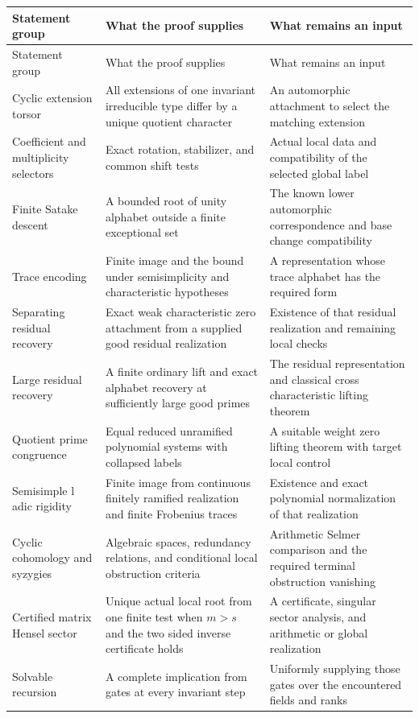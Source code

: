 \begin{longtable}{>{\raggedright\arraybackslash}p{.24\linewidth}>{\raggedright\arraybackslash}p{.33\linewidth}>{\raggedright\arraybackslash}p{.34\linewidth}}
\toprule
Statement group & What the proof supplies & What remains an input\\
\midrule
\endfirsthead
\toprule
Statement group & What the proof supplies & What remains an input\\
\midrule
\endhead
Cyclic extension torsor & All extensions of one invariant irreducible type differ by a unique quotient character & An automorphic attachment to select the matching extension\\
Coefficient and multiplicity selectors & Exact rotation, stabilizer, and common shift tests & Actual local data and compatibility of the selected global label\\
Finite Satake descent & A bounded root of unity alphabet outside a finite exceptional set & The known lower automorphic correspondence and base change compatibility\\
Trace encoding & Finite image and the bound under semisimplicity and characteristic hypotheses & A representation whose trace alphabet has the required form\\
Separating residual recovery & Exact weak characteristic zero attachment from a supplied good residual realization & Existence of that residual realization and remaining local checks\\
Large residual recovery & A finite ordinary lift and exact alphabet recovery at sufficiently large good primes & The residual representation and classical cross characteristic lifting theorem\\
Quotient prime congruence & Equal reduced unramified polynomial systems with collapsed labels & A suitable weight zero lifting theorem with target local control\\
Semisimple l adic rigidity & Finite image from continuous finitely ramified realization and finite Frobenius traces & Existence and exact polynomial normalization of that realization\\
Cyclic cohomology and syzygies & Algebraic spaces, redundancy relations, and conditional local obstruction criteria & Arithmetic Selmer comparison and the required terminal obstruction vanishing\\
Certified matrix Hensel sector & Unique actual local root from one finite test when \(m>s\) and the two sided inverse certificate holds & A certificate, singular sector analysis, and arithmetic or global realization\\
Solvable recursion & A complete implication from gates at every invariant step & Uniformly supplying those gates over the encountered fields and ranks\\
\bottomrule
\end{longtable}

